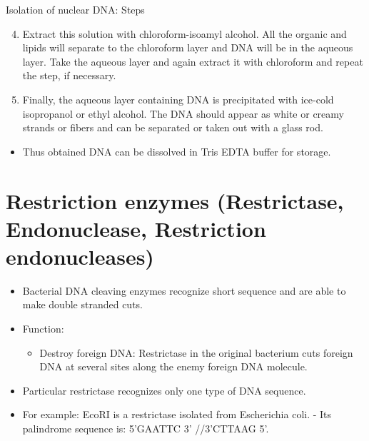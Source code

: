 \documentclass[11pt,dvipsnames,ignorenonframetext,aspectratio=169]{beamer}
\providecommand{\tightlist}{%
  \setlength{\itemsep}{0pt}\setlength{\parskip}{0pt}}
\begin{document}
\begin{frame}{Isolation of nuclear DNA: Steps}
\protect\hypertarget{isolation-of-nuclear-dna-steps-1}{}

\begin{enumerate}
\setcounter{enumi}{3}
\tightlist
\item
  Extract this solution with chloroform-isoamyl alcohol. All the organic
  and lipids will separate to the chloroform layer and DNA will be in
  the aqueous layer. Take the aqueous layer and again extract it with
  chloroform and repeat the step, if necessary.
\item
  Finally, the aqueous layer containing DNA is precipitated with
  ice-cold isopropanol or ethyl alcohol. The DNA should appear as white
  or creamy strands or fibers and can be separated or taken out with a
  glass rod.
\end{enumerate}

\begin{itemize}
\tightlist
\item
  Thus obtained DNA can be dissolved in Tris EDTA buffer for storage.
\end{itemize}

\end{frame}

\hypertarget{restriction-enzymes-restrictase-endonuclease-restriction-endonucleases}{%
\section{Restriction enzymes (Restrictase, Endonuclease, Restriction
endonucleases)}\label{restriction-enzymes-restrictase-endonuclease-restriction-endonucleases}}

\begin{frame}{}
\protect\hypertarget{section-8}{}

\begin{itemize}
\tightlist
\item
  Bacterial DNA cleaving enzymes recognize short sequence and are able
  to make double stranded cuts.
\item
  Function:

  \begin{itemize}
  \tightlist
  \item
    Destroy foreign DNA: Restrictase in the original bacterium cuts
    foreign DNA at several sites along the enemy foreign DNA molecule.
  \end{itemize}
\item
  Particular restrictase recognizes only one type of DNA sequence.
\item
  For example: EcoRI is a restrictase isolated from Escherichia coli. -
  Its palindrome sequence is: 5'GAATTC 3' //3'CTTAAG 5'.
\end{itemize}

\end{frame}
\end{document}
